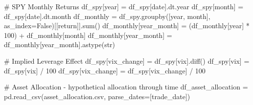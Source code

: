 \documentclass[
  letterpaper,
  DIV=11,
  numbers=noendperiod]{scrreprt}
\newenvironment{Shaded}{\begin{snugshade}}{\end{snugshade}}
\newcommand{\BuiltInTok}[1]{\textcolor[rgb]{0.00,0.23,0.31}{#1}}
\newcommand{\CommentTok}[1]{\textcolor[rgb]{0.37,0.37,0.37}{#1}}
\newcommand{\DecValTok}[1]{\textcolor[rgb]{0.68,0.00,0.00}{#1}}
\newcommand{\NormalTok}[1]{\textcolor[rgb]{0.00,0.23,0.31}{#1}}
\newcommand{\OperatorTok}[1]{\textcolor[rgb]{0.37,0.37,0.37}{#1}}
\newcommand{\StringTok}[1]{\textcolor[rgb]{0.13,0.47,0.30}{#1}}
\newcommand{\VariableTok}[1]{\textcolor[rgb]{0.07,0.07,0.07}{#1}}
\begin{document}
\begin{Shaded}
\begin{Highlighting}[]
\CommentTok{\# SPY Monthly Returns}
\NormalTok{df\_spy[}\StringTok{\textquotesingle{}year\textquotesingle{}}\NormalTok{] }\OperatorTok{=}\NormalTok{ df\_spy[}\StringTok{\textquotesingle{}date\textquotesingle{}}\NormalTok{].dt.year}
\NormalTok{df\_spy[}\StringTok{\textquotesingle{}month\textquotesingle{}}\NormalTok{] }\OperatorTok{=}\NormalTok{ df\_spy[}\StringTok{\textquotesingle{}date\textquotesingle{}}\NormalTok{].dt.month}
\NormalTok{df\_monthly }\OperatorTok{=}\NormalTok{ df\_spy.groupby([}\StringTok{\textquotesingle{}year\textquotesingle{}}\NormalTok{, }\StringTok{\textquotesingle{}month\textquotesingle{}}\NormalTok{], as\_index}\OperatorTok{=}\VariableTok{False}\NormalTok{)[[}\StringTok{\textquotesingle{}return\textquotesingle{}}\NormalTok{]].}\BuiltInTok{sum}\NormalTok{()}
\NormalTok{df\_monthly[}\StringTok{\textquotesingle{}year\_month\textquotesingle{}}\NormalTok{] }\OperatorTok{=}\NormalTok{ (df\_monthly[}\StringTok{\textquotesingle{}year\textquotesingle{}}\NormalTok{] }\OperatorTok{*} \DecValTok{100}\NormalTok{) }\OperatorTok{+}\NormalTok{ df\_monthly[}\StringTok{\textquotesingle{}month\textquotesingle{}}\NormalTok{]}
\NormalTok{df\_monthly[}\StringTok{\textquotesingle{}year\_month\textquotesingle{}}\NormalTok{] }\OperatorTok{=}\NormalTok{ df\_monthly[}\StringTok{\textquotesingle{}year\_month\textquotesingle{}}\NormalTok{].astype(}\BuiltInTok{str}\NormalTok{)}

\CommentTok{\# Implied Leverage Effect}
\NormalTok{df\_spy[}\StringTok{\textquotesingle{}vix\_change\textquotesingle{}}\NormalTok{] }\OperatorTok{=}\NormalTok{ df\_spy[}\StringTok{\textquotesingle{}vix\textquotesingle{}}\NormalTok{].diff()}
\NormalTok{df\_spy[}\StringTok{\textquotesingle{}vix\textquotesingle{}}\NormalTok{] }\OperatorTok{=}\NormalTok{ df\_spy[}\StringTok{\textquotesingle{}vix\textquotesingle{}}\NormalTok{] }\OperatorTok{/} \DecValTok{100}
\NormalTok{df\_spy[}\StringTok{\textquotesingle{}vix\_change\textquotesingle{}}\NormalTok{] }\OperatorTok{=}\NormalTok{ df\_spy[}\StringTok{\textquotesingle{}vix\_change\textquotesingle{}}\NormalTok{] }\OperatorTok{/} \DecValTok{100}

\CommentTok{\# Asset Allocation {-} hypothetical allocation through time}
\NormalTok{df\_asset\_allocation }\OperatorTok{=}\NormalTok{ pd.read\_csv(}\StringTok{\textquotesingle{}asset\_allocation.csv\textquotesingle{}}\NormalTok{, parse\_dates}\OperatorTok{=}\NormalTok{[}\StringTok{\textquotesingle{}trade\_date\textquotesingle{}}\NormalTok{])}
\end{Highlighting}
\end{Shaded}
\end{document}
